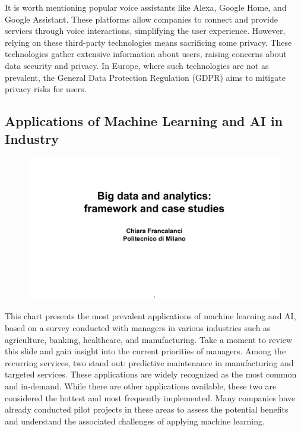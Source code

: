 It is worth mentioning popular voice assistants like Alexa, Google Home,
and Google Assistant. These platforms allow companies to connect and
provide services through voice interactions, simplifying the user
experience. However, relying on these third-party technologies means
sacrificing some privacy. These technologies gather extensive
information about users, raising concerns about data security and
privacy. In Europe, where such technologies are not as prevalent, the
General Data Protection Regulation (GDPR) aims to mitigate privacy risks
for users.


\subsection{Applications of Machine Learning and AI in
    Industry}\label{applications-of-machine-learning-and-ai-in-industry}


\begin{figure}[!h]
    \centering
    \includegraphics[page=19, trim = 0cm 1.5cm 1.5cm 0.7cm, clip, width=\textwidth]{images/06 - BIG_DATA.pdf}
\end{figure}

This chart presents the most prevalent applications of machine learning
and AI, based on a survey conducted with managers in various industries
such as agriculture, banking, healthcare, and manufacturing. Take a
moment to review this slide and gain insight into the current priorities
of managers. Among the recurring services, two stand out: predictive
maintenance in manufacturing and targeted services. These applications
are widely recognized as the most common and in-demand. While there are
other applications available, these two are considered the hottest and
most frequently implemented. Many companies have already conducted pilot
projects in these areas to assess the potential benefits and understand
the associated challenges of applying machine learning.


